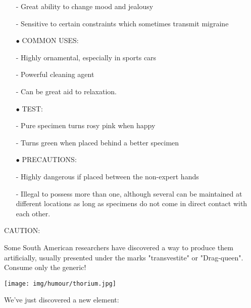 \begin{itemize}
- Great ability to change mood and jealousy

- Sensitive to certain constraints which sometimes transmit migraine

	\item[$\bullet$] COMMON USES: 

- Highly ornamental, especially in sports cars

- Powerful cleaning agent

- Can be great aid to relaxation.

	\item[$\bullet$] TEST: 

- Pure specimen turns rosy pink when happy

- Turns green when placed behind a better specimen

	\item[$\bullet$] PRECAUTIONS:

- Highly dangerous if placed between the non-expert hands

- Illegal to possess more than one, although several can be maintained at different locations as long as specimens do not come in direct contact with each other.

\end{itemize}

CAUTION: 

Some South American researchers have discovered a way to produce them artificially, usually presented under the marks "transvestite" or "Drag-queen". Consume only the generic!
	\begin{center}\underline{\hspace{5 cm}}\end{center}

	\begin{center}
	\texttt{[image: img/humour/thorium.jpg]}
	\end{center}
	
	\begin{center}\underline{\hspace{5 cm}}\end{center}

We've just discovered a new element:

